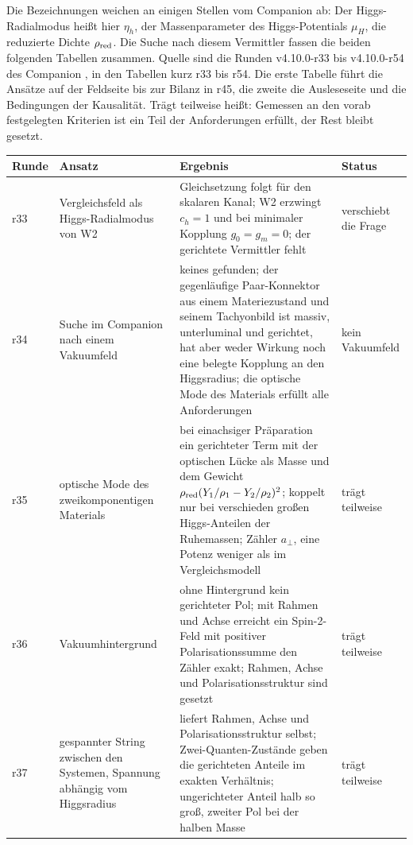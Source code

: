 Die Bezeichnungen weichen an einigen Stellen vom Companion ab: Der Higgs-Radialmodus heißt hier \(\eta_h\), der Massenparameter des
Higgs-Potentials \(\mu_H\), die reduzierte Dichte \(\rho_{\rm red}\). Die Suche nach diesem Vermittler fassen die beiden folgenden Tabellen zusammen. Quelle sind die Runden v4.10.0-r33 bis v4.10.0-r54 des
Companion \cite{layers}, in den Tabellen kurz r33 bis r54. Die erste Tabelle führt die Ansätze auf der Feldseite bis zur Bilanz in r45, die
zweite die Ausleseseite und die Bedingungen der Kausalität. \glqq Trägt teilweise\grqq{} heißt: Gemessen an den vorab festgelegten Kriterien ist
ein Teil der Anforderungen erfüllt, der Rest bleibt gesetzt.

\begin{center}
\small
\begin{tabular}{@{}p{.07\linewidth}p{.25\linewidth}p{.43\linewidth}p{.15\linewidth}@{}}
\hline
\textbf{Runde} & \textbf{Ansatz} & \textbf{Ergebnis} & \textbf{Status} \\
\hline
r33 & Vergleichsfeld als Higgs-Radialmodus von W2 & Gleichsetzung folgt für den skalaren Kanal; W2 erzwingt \(c_h=1\) und bei minimaler Kopplung \(g_0=g_m=0\); der gerichtete Vermittler fehlt & verschiebt die Frage \\
r34 & Suche im Companion nach einem Vakuumfeld & keines gefunden; der gegenläufige Paar-Konnektor aus einem Materiezustand und seinem Tachyonbild ist massiv, unterluminal und gerichtet, hat aber weder Wirkung noch eine belegte Kopplung an den Higgsradius; die optische Mode des Materials erfüllt alle Anforderungen & kein Vakuumfeld \\
r35 & optische Mode des zweikomponentigen Materials & bei einachsiger Präparation ein gerichteter Term mit der optischen Lücke als Masse und dem Gewicht \(\rho_{\rm red}(Y_1/\rho_1-Y_2/\rho_2)^2\); koppelt nur bei verschieden großen Higgs-Anteilen der Ruhemassen; Zähler \(a_\perp\), eine Potenz weniger als im Vergleichsmodell & trägt teilweise \\
r36 & Vakuumhintergrund & ohne Hintergrund kein gerichteter Pol; mit Rahmen und Achse erreicht ein Spin-2-Feld mit positiver Polarisationssumme den Zähler exakt; Rahmen, Achse und Polarisationsstruktur sind gesetzt & trägt teilweise \\
r37 & gespannter String zwischen den Systemen, Spannung abhängig vom Higgsradius & liefert Rahmen, Achse und Polarisationsstruktur selbst; Zwei-Quanten-Zustände geben die gerichteten Anteile im exakten Verhältnis; ungerichteter Anteil halb so groß, zweiter Pol bei der halben Masse & trägt teilweise \\

\end{tabular}
\end{center}

